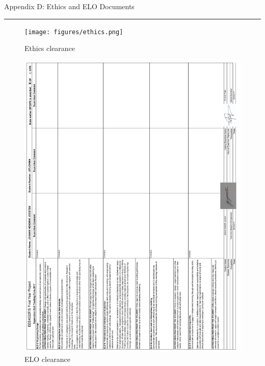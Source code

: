 \thispagestyle{plain}
{\Large Appendix D: Ethics and ELO Documents}
\vskip 5mm
\hrule

\begin{figure}[!ht] 
\captionsetup{width=0.8\linewidth, font=small}  
\texttt{[image: figures/ethics.png]}
\caption{Ethics clearance}
\label{fig:ethics}
\end{figure}

\newpage
\begin{figure}[!ht] 
\captionsetup{width=0.8\linewidth, font=small}  
\includegraphics[width=1\linewidth]{figures/elo.png}
\caption{ELO clearance}
\label{fig:elo}
\end{figure}